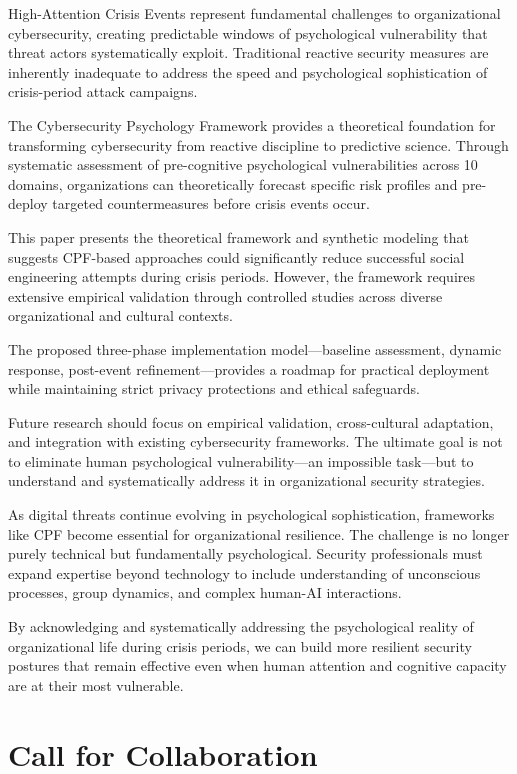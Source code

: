 \documentclass[11pt,a4paper]{article}
\begin{document}
High-Attention Crisis Events represent fundamental challenges to organizational cybersecurity, creating predictable windows of psychological vulnerability that threat actors systematically exploit. Traditional reactive security measures are inherently inadequate to address the speed and psychological sophistication of crisis-period attack campaigns.

The Cybersecurity Psychology Framework provides a theoretical foundation for transforming cybersecurity from reactive discipline to predictive science. Through systematic assessment of pre-cognitive psychological vulnerabilities across 10 domains, organizations can theoretically forecast specific risk profiles and pre-deploy targeted countermeasures before crisis events occur.

This paper presents the theoretical framework and synthetic modeling that suggests CPF-based approaches could significantly reduce successful social engineering attempts during crisis periods. However, the framework requires extensive empirical validation through controlled studies across diverse organizational and cultural contexts.

The proposed three-phase implementation model—baseline assessment, dynamic response, post-event refinement—provides a roadmap for practical deployment while maintaining strict privacy protections and ethical safeguards.

Future research should focus on empirical validation, cross-cultural adaptation, and integration with existing cybersecurity frameworks. The ultimate goal is not to eliminate human psychological vulnerability—an impossible task—but to understand and systematically address it in organizational security strategies.

As digital threats continue evolving in psychological sophistication, frameworks like CPF become essential for organizational resilience. The challenge is no longer purely technical but fundamentally psychological. Security professionals must expand expertise beyond technology to include understanding of unconscious processes, group dynamics, and complex human-AI interactions.

By acknowledging and systematically addressing the psychological reality of organizational life during crisis periods, we can build more resilient security postures that remain effective even when human attention and cognitive capacity are at their most vulnerable.

\section*{Call for Collaboration}
\end{document}
